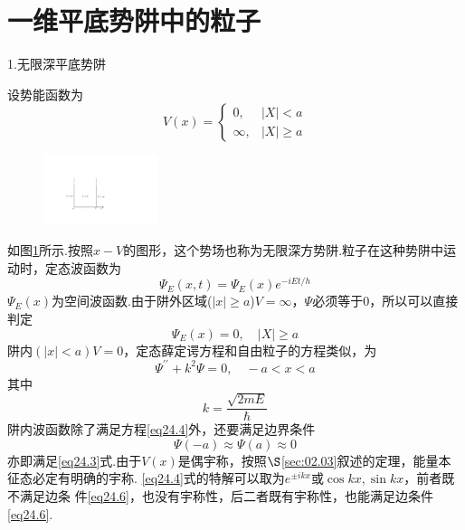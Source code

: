 \section[一维平底势阱中的粒子]{一维平底势阱中的粒子} \label{sec:02.04} %

{\heiti 1.无限深平底势阱}

设势能函数为
\begin{equation}\label{eq24.1}
	V(x)=
	\begin{cases}
		0, &|X|<a \\
		\infty,	&|X|\geqslant a
	\end{cases}
\end{equation}

\begin{figure}
	\centering
	\small
	\includegraphics[width=9em]{QM file/figure/2-2}
	\caption{}\label{fig.2-2}
\end{figure}
如图\ref{fig.2-2}所示.按照$x-V$的图形，这个势场也称为无限深方势阱.粒子在这种势阱中运动时，定态波函数为
\eqlong
\begin{equation}\label{eq24.2}
	\varPsi_{E}(x,t)=\varPsi_{E}(x)e^{-iEt/h}
\end{equation}
$\varPsi_{E}(x)$为空间波函数.由于阱外区域($|x|\geqslant a$)$V=\infty$，$\varPsi$必须等于0，所以可以直接判定
\begin{equation}\label{eq24.3}
	\varPsi_{E}(x)=0,\quad |X|\geqslant a
\end{equation}\eqnormal
阱内$(|x|<a)V=0$，定态薛定谔方程和自由粒子的方程类似，为
\begin{equation}\label{eq24.4}
	\varPsi^{\prime\prime}+k^{2}\varPsi=0,\quad -a<x<a
\end{equation}
其中
\begin{equation}\label{eq24.5}
	k=\frac{\sqrt{2mE}}{\hbar}
\end{equation}
阱内波函数除了满足方程\eqref{eq24.4}外，还要满足边界条件
\begin{equation}\label{eq24.6}
	\varPsi(-a)\approx\varPsi(a)\approx 0
\end{equation}
亦即满足\eqref{eq24.3}式.由于$V(x)$是偶宇称，按照$\S$\ref{sec:02.03}叙述的定理，能量本征态必定有明确的宇称. \eqref{eq24.4}式的特解可以取为$e^{\pm ikx}$或$\cos kx,\sin kx$，前者既不满足边条
件\eqref{eq24.6}，也没有宇称性，后二者既有宇称性，也能满足边条件\eqref{eq24.6}.

